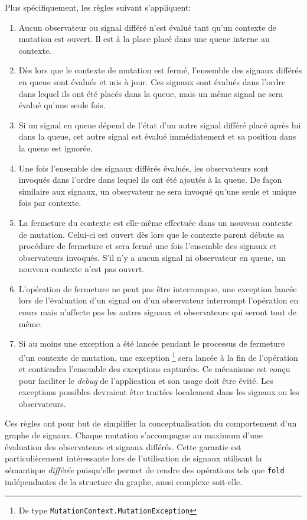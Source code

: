 Plus spécifiquement, les règles suivant s'appliquent:
\begin{enumerate}[label=\alph*]
	\item Aucun observateur ou signal différé n'est évalué tant qu'un contexte de mutation est ouvert. Il est à la place placé dans une queue interne au contexte.
	\item Dès lors que le contexte de mutation est fermé, l'ensemble des signaux différés en queue sont évalués et mis à jour. Ces signaux sont évalués dans l'ordre dans lequel ils ont été placés dans la queue, mais un même signal ne sera évalué qu'une seule fois.
	\item Si un signal en queue dépend de l'état d'un autre signal différé placé après lui dans la queue, cet autre signal est évalué immédiatement et sa position dans la queue est ignorée.
	\item Une fois l'ensemble des signaux différés évalués, les observateurs sont invoqués dans l'ordre dans lequel ils ont été ajoutés à la queue. De façon similaire aux signaux, un observateur ne sera invoqué qu'une seule et unique fois par contexte.
	\item La fermeture du contexte est elle-même effectuée dans un nouveau contexte de mutation. Celui-ci est ouvert dès lors que le contexte parent débute sa procédure de fermeture et sera fermé une fois l'ensemble des signaux et observateurs invoqués. S'il n'y a aucun signal ni observateur en queue, un nouveau contexte n'est pas ouvert.
	\item L'opération de fermeture ne peut pas être interrompue, une exception lancée lors de l'évaluation d'un signal ou d'un observateur interrompt l'opération en cours mais n'affecte pas les autres signaux et observateurs qui seront tout de même.
	\item Si au moins une exception a été lancée pendant le processus de fermeture d'un contexte de mutation, une exception \footnote{De type \texttt{MutationContext.MutationException}} sera lancée à la fin de l'opération et contiendra l'ensemble des exceptions capturées. Ce mécanisme est conçu pour faciliter le \emph{debug} de l'application et son usage doit être évité. Les exceptions possibles devraient être traitées localement dans les signaux ou les observateurs.
\end{enumerate}

Ces règles ont pour but de simplifier la conceptualisation du comportement d'un graphe de signaux. Chaque mutation s'accompagne au maximum d'une évaluation des observateurs et signaux différés. Cette garantie est particulièrement intéressante lors de l'utilisation de signaux utilisant la sémantique \emph{différée} puisqu'elle permet de rendre des opérations tels que \texttt{fold} indépendantes de la structure du graphe, aussi complexe soit-elle.

